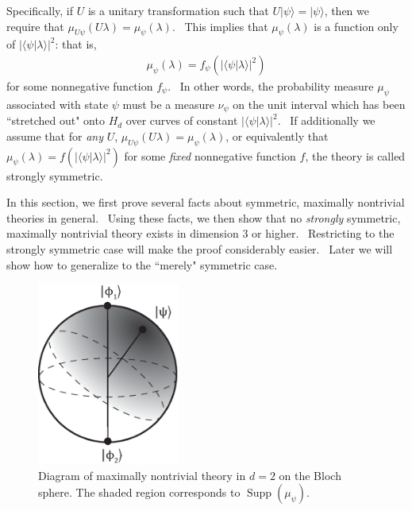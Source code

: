 \documentclass[letterpaper,12pt]{article}
\DeclareMathOperator{\supp}{Supp}
\begin{document}
Specifically, if $U$ is a unitary transformation such that $U | \psi
\rangle = | \psi \rangle $, then we require that $%
\mu_{U\psi}(U\lambda)=\mu_{\psi}(\lambda)$. \ This implies that $%
\mu_{\psi}(\lambda)$ is a function only of $| \langle \psi | \lambda
\rangle |^2$: that is,
\begin{eqnarray}
\mu_{\psi}(\lambda)=f_{\psi}\left(| \langle \psi | \lambda \rangle %
|^2\right)
\end{eqnarray}
for some nonnegative function $f_{\psi}$. \ In other words, the probability
measure $\mu_\psi$ associated with state $\psi$ must be a measure $\nu_\psi$
on the unit interval which has been ``stretched out" onto $H_d$ over curves
of constant $|\langle \psi | \lambda \rangle |^2$. \ If additionally we assume that for \emph{any} $U$, $\mu_{U\psi}(U\lambda)=\mu_{\psi}(\lambda)$, or equivalently that $\mu_{\psi}(\lambda)=f\left(| \langle \psi | \lambda \rangle %
|^2\right)
$
for some \emph{fixed} nonnegative function $f$, the theory is called strongly symmetric.

In this section, we first prove several facts about symmetric, maximally nontrivial theories in general. \ Using these facts, we then show that no \emph{strongly} symmetric, maximally nontrivial theory exists in dimension 3 or higher. \ Restricting to the strongly symmetric case will make the proof considerably easier. \ Later we will show how to generalize to the ``merely" symmetric case.




\begin{figure}[h] \centering
\includegraphics[height=6cm]{figks2.eps} \vspace{-20pt}
\caption{Diagram of maximally nontrivial theory in $d=2$ on the Bloch sphere. The shaded region corresponds to $\supp(\mu_{\psi})$.} \label{figks}
\end{figure}
\end{document}
